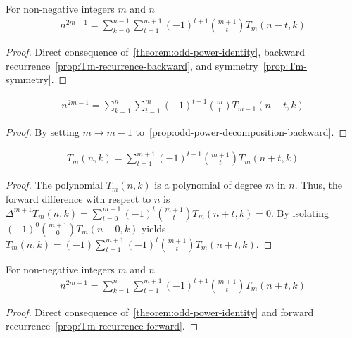 \begin{proposition}
    \label{prop:odd-power-decomposition-backward-shifted}
    For non-negative integers $m$ and $n$
    \begin{align*}
        n^{2m+1} = \sum_{k=0}^{n-1} \sum_{t=1}^{m+1} (-1)^{t+1} \binom{m+1}{t} T_{m} (n-t, k)
    \end{align*}
    \begin{proof}
        Direct consequence of~\eqref{theorem:odd-power-identity},
        backward recurrence~\eqref{prop:Tm-recurrence-backward}, and symmetry~\eqref{prop:Tm-symmetry}.
    \end{proof}
\end{proposition}

\begin{corollary}
    \label{cor:odd-power-decomposition-m-1}
    \begin{align*}
        n^{2m-1} = \sum_{k=1}^{n} \sum_{t=1}^{m} (-1)^{t+1} \binom{m}{t} T_{m-1} (n-t, k)
    \end{align*}
    \begin{proof}
        By setting $m \rightarrow m-1$ to~\eqref{prop:odd-power-decomposition-backward}.
    \end{proof}
\end{corollary}

\begin{proposition}
    \label{prop:Tm-recurrence-forward}
    \begin{align*}
        T_{m} (n,k) = \sum_{t=1}^{m+1} (-1)^{t+1} \binom{m+1}{t} T_{m} (n+t, k)
    \end{align*}
    \begin{proof}
        The polynomial $T_{m} (n,k)$ is a polynomial of degree $m$ in $n$.
        Thus, the forward difference with respect to $n$ is
        $\Delta^{m+1} T_{m} (n, k) = \sum_{t=0}^{m+1} (-1)^{t} \binom{m+1}{t} T_{m} (n+t, k) = 0$.
        By isolating $(-1)^{0} \binom{m+1}{0} T_{m} (n-0, k)$ yields
        $T_{m} (n, k) = (-1) \sum_{t=1}^{m+1} (-1)^{t} \binom{m+1}{t} T_{m} (n+t, k)$.
    \end{proof}
\end{proposition}

\begin{proposition}
    \label{prop:odd-power-decomposition-forward}
    For non-negative integers $m$ and $n$
    \begin{align*}
        n^{2m+1} = \sum_{k=1}^{n} \sum_{t=1}^{m+1} (-1)^{t+1} \binom{m+1}{t} T_{m} (n+t, k)
    \end{align*}
    \begin{proof}
        Direct consequence of~\eqref{theorem:odd-power-identity}
        and forward recurrence~\eqref{prop:Tm-recurrence-forward}.
    \end{proof}
\end{proposition}

